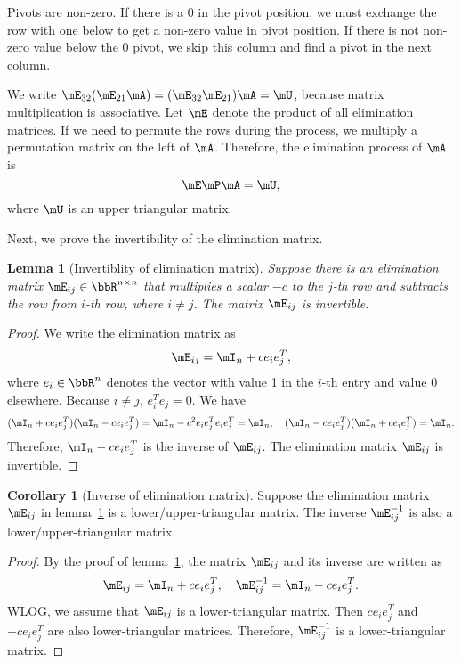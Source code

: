 \documentclass[11pt]{article}
\theoremstyle{plain}
\newtheorem{lem}{Lemma}
\theoremstyle{definition}
\newtheorem{cor}{Corollary}
\begin{document}
Pivots are non-zero. If there is a 0 in the pivot position, we must exchange the row with one below to get a non-zero value in pivot position. If there is not non-zero value below the 0 pivot, we skip this column and find a pivot in the next column. 

\vspace{.2cm}
We write $\mE_{32} (\mE_{21} \mA) = (\mE_{32} \mE_{21} ) \mA = \mU$, because matrix multiplication is associative. Let $\mE$ denote the product of all elimination matrices. If we need to permute the rows during the process, we multiply a permutation matrix on the left of $\mA$. Therefore, the elimination process of $\mA$ is
\begin{equation}\label{eq:factor}
	\mE \mP \mA = \mU,
\end{equation}
 where  $\mU$ is an upper triangular matrix.


\vspace{.2cm}
Next, we prove the invertibility of the elimination matrix.
\begin{lem}[Invertiblity of elimination matrix]\label{lem:elim}
 Suppose there is an elimination matrix $\mE_{ij} \in \bbR^{n \times n}$ that multiplies a scalar $-c$ to the  $j$-th row and subtracts the row from $i$-th row, where $i \neq j$. The matrix $\mE_{ij}$ is invertible.
\end{lem}
\begin{proof}
	We write the elimination matrix as
	\[ \mE_{ij} = \mI_n + c e_i e_{j}^T, \]
	where $e_i \in \bbR^n$ denotes the vector with value 1 in the $i$-th entry and value 0 elsewhere.  Because $i \neq j$, $e^T_i e_{j} = 0$.  We have 
	\[ (\mI_n + c e_i e_{j}^T)(\mI_n - c e_i e_{j}^T)  = \mI_n - c^2 e_i e_{j}^T e_i e_{j}^T = \mI_n; \quad (\mI_n - c e_i e_{j}^T)(\mI_n + c e_i e_{j}^T)= \mI_n. \]
	Therefore, $\mI_n - c e_i e_{j}^T$ is the inverse of $\mE_{ij}$. The elimination matrix $\mE_{ij}$  is invertible.
\end{proof}

\begin{cor}[Inverse of elimination matrix]\label{cor:invelim} 
Suppose the elimination matrix $\mE_{ij}$ in lemma~\ref{lem:elim} is a lower/upper-triangular matrix. The inverse $\mE_{ij}^{-1}$ is also a lower/upper-triangular matrix.
\end{cor}
\begin{proof}
	By the proof of lemma~\ref{lem:elim}, the matrix $\mE_{ij}$ and its inverse are written as
	\[ \mE_{ij} = \mI_n + c e_i e_{j}^T, \quad \mE^{-1}_{ij} = \mI_n - c e_i e_{j}^T.\]
	WLOG, we assume that $\mE_{ij}$ is a lower-triangular matrix. Then $c e_i e_{j}^T$ and  $-c e_i e_{j}^T$ are also lower-triangular matrices. Therefore, $\mE_{ij}^{-1}$ is a lower-triangular matrix.
\end{proof}
\end{document}
